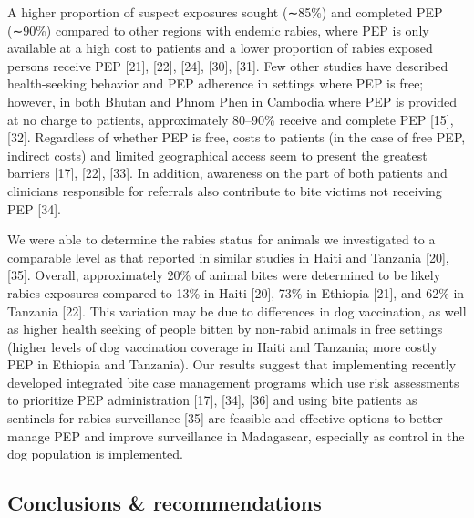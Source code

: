 \documentclass[
  oneside]{book}
\begin{document}
A higher proportion of suspect exposures sought (∼85\%) and completed PEP (∼90\%) compared to other regions with endemic rabies, where PEP is only available at a high cost to patients and a lower proportion of rabies exposed persons receive PEP {[}21{]}, {[}22{]}, {[}24{]}, {[}30{]}, {[}31{]}. Few other studies have described health-seeking behavior and PEP adherence in settings where PEP is free; however, in both Bhutan and Phnom Phen in Cambodia where PEP is provided at no charge to patients, approximately 80--90\% receive and complete PEP {[}15{]}, {[}32{]}. Regardless of whether PEP is free, costs to patients (in the case of free PEP, indirect costs) and limited geographical access seem to present the greatest barriers {[}17{]}, {[}22{]}, {[}33{]}. In addition, awareness on the part of both patients and clinicians responsible for referrals also contribute to bite victims not receiving PEP {[}34{]}.

We were able to determine the rabies status for animals we investigated to a comparable level as that reported in similar studies in Haiti and Tanzania {[}20{]}, {[}35{]}. Overall, approximately 20\% of animal bites were determined to be likely rabies exposures compared to 13\% in Haiti {[}20{]}, 73\% in Ethiopia {[}21{]}, and 62\% in Tanzania {[}22{]}. This variation may be due to differences in dog vaccination, as well as higher health seeking of people bitten by non-rabid animals in free settings (higher levels of dog vaccination coverage in Haiti and Tanzania; more costly PEP in Ethiopia and Tanzania). Our results suggest that implementing recently developed integrated bite case management programs which use risk assessments to prioritize PEP administration {[}17{]}, {[}34{]}, {[}36{]} and using bite patients as sentinels for rabies surveillance {[}35{]} are feasible and effective options to better manage PEP and improve surveillance in Madagascar, especially as control in the dog population is implemented.

\hypertarget{conclusions-recommendations}{%
\subsection{Conclusions \& recommendations}\label{conclusions-recommendations}}
\end{document}
